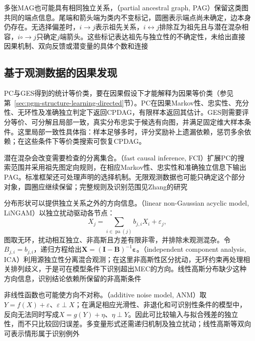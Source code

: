多张MAG也可能具有相同独立关系，（partial ancestral graph, PAG）保留这类图共同的端点信息。尾端和箭头端为类内不变标记，圆圈表示端点尚未确定，边本身仍存在。无选择偏差时，$i\to j$表示祖先关系，$i\leftrightarrow j$排除互为祖先且与潜在混杂相容，$i\mathbin{\circ\!\!\to}j$只确定$j$端箭头。这些标记表达祖先与独立性的不确定性，未给出直接因果机制、双向反馈或潜变量的具体个数和连接

\subsection{基于观测数据的因果发现}
\label{sec:pgm-structure-learning-observational}

PC与GES得到的统计等价类，要在因果假设下才能解释为因果等价类（参见第~\ref{sec:pgm-structure-learning-directed}节）。PC在因果Markov性、忠实性、充分性、无环性及准确独立判定下返回CPDAG，有限样本返回其估计。GES则需要评分等价、可分解且局部一致，真实分布忠实于候选有向图，并满足固定维大样本条件。这里局部一致性具体指：样本足够多时，评分奖励补上遗漏依赖，惩罚多余依赖；在这些条件下等价类搜索可恢复CPDAG。

潜在混杂会改变需要检查的分离集合。（fast causal inference, FCI）扩展PC的搜索范围并采用祖先图定向规则，在相应Markov性、忠实性和准确独立信息下输出PAG。标准框架还可处理声明的选择机制。无限观测数据也可能只确定这个部分对象，圆圈应继续保留；完整规则及识别范围见Zhang的研究

分布形状可以提供独立关系之外的方向信息。（linear non-Gaussian acyclic model, LiNGAM）以独立扰动驱动各节点：
\[
  X_j=\sum_{i\in\operatorname{pa}(j)}b_{j,i}X_i+\varepsilon_j,
\]
图取无环，扰动相互独立、非高斯且方差有限非零，并排除未观测混杂。令$B_{j,i}=b_{j,i}$，递归方程给出$\bm{X}=(\bm{I}-\bm{B})^{-1}\bm{\varepsilon}$。（independent component analysis, ICA）利用源独立性分离混合观测；在这里非高斯性区分扰动，无环约束再处理相关排列歧义，于是可在模型条件下识别超出MEC的方向。线性高斯分布缺少这种方向信息，识别结论依赖所保留的非高斯条件

非线性函数也可能使方向不对称。（additive noise model, ANM）取$Y=f(X)+\varepsilon$、$\varepsilon\perp X$；在满足相应光滑性、非退化和可识别性条件的模型中，反向无法同时写成$X=g(Y)+\eta$、$\eta\perp Y$。因此可比较输入与拟合残差的独立性，而不只比较回归误差。多变量形式还需递归机制及独立扰动；线性高斯等双向可表示情形属于识别例外

